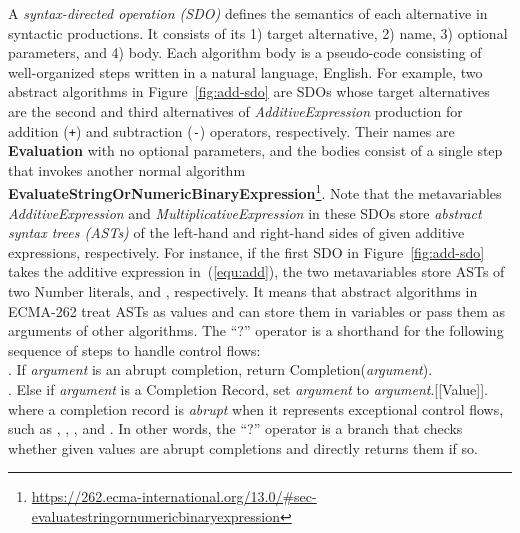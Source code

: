 \documentclass[acmsmall,review,screen]{acmart}
\newcommand{\jscode}[1]{\text{\lstinline[style=JS]!#1!}}
\newcommand{\scode}[1]{\texttt{\small{#1}}}
\newcommand{\esnt}[1]{\textit{\color{esnt}#1}}
\newcommand{\esalg}[1]{{\color{esalg}#1}}
\newcommand{\esvar}[1]{\textit{\color{esvar}#1}}
\begin{document}
A \textit{syntax-directed operation (SDO)} defines the semantics of each
alternative in syntactic productions.
It consists of its 1) target alternative, 2) name, 3) optional parameters, and 4) body.
Each algorithm body is a pseudo-code consisting of well-organized steps written
in a natural language, English.
For example, two abstract algorithms in Figure~\ref{fig:add-sdo} are SDOs whose
target alternatives are the second and third alternatives of
\esnt{AdditiveExpression} production for addition (\scode{+}) and subtraction
(\scode{-}) operators, respectively.
Their names are \textbf{Evaluation} with no optional parameters, and
the bodies consist of a single step that invokes another normal algorithm
\textbf{EvaluateStringOrNumericBinaryExpression}\footnote{
\url{https://262.ecma-international.org/13.0/\#sec-evaluatestringornumericbinaryexpression}}.
Note that the metavariables \esnt{AdditiveExpression} and
\esnt{MultiplicativeExpression} in these SDOs store \textit{abstract syntax
trees (ASTs)} of the left-hand and right-hand sides of given additive
expressions, respectively.
For instance, if the first SDO in Figure~\ref{fig:add-sdo} takes the additive
expression in~(\ref{equ:add}), the two metavariables store ASTs of two Number
literals, \jscode{1} and \jscode{2}, respectively.
It means that abstract algorithms in ECMA-262 treat ASTs as values and can
store them in variables or pass them as arguments of other algorithms.
The ``?'' operator is a shorthand for the following sequence of steps to handle control flows:
\vspace*{.5em}\\
{
  \noindent
  \null{}. If \esvar{argument} is an abrupt completion, return
  \esalg{Completion}(\esvar{argument}).
  \\
  \null{}. Else if \esvar{argument} is a Completion Record, set
  \esvar{argument} to \esvar{argument}.[[Value]].
}
\vspace*{.5em}\\
where a completion record is \textit{abrupt} when it represents exceptional
control flows, such as \jscode{throw}, \jscode{return}, \jscode{break}, and
\jscode{continue}.
In other words, the ``?'' operator is a branch that checks whether given
values are abrupt completions and directly returns them if so.

\end{document}
